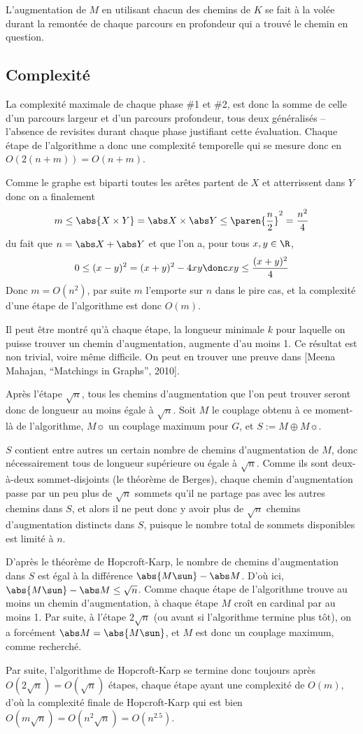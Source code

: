 L'augmentation de $M$ en utilisant chacun des chemins de $K$ se fait à la volée durant la remontée de chaque parcours en profondeur qui a trouvé le chemin en question.

 \subsection{Complexité}
 
  La complexité maximale de chaque phase \#1 et \#2, est donc la somme de celle d'un parcours largeur et d'un parcours profondeur, tous deux généralisés -- l'absence de revisites durant chaque phase justifiant cette évaluation. Chaque étape de l'algorithme a donc une complexité temporelle qui se mesure donc en $O(2(n+m)) = O(n + m)$.
 
 Comme le graphe est biparti toutes les arêtes partent de $X$ et atterrissent dans $Y$ donc on a finalement
 \[ m \leq \abs {X \times  Y} = \abs X \times \abs Y \leq \paren{\dfrac n 2}^2 = \dfrac {n^2} 4 \]
 du fait que $n = \abs X + \abs Y$ et que l'on a, pour tous $x,y \in \R$,
 \[0 \leq (x - y)^2  = (x + y)^2 - 4xy \donc xy \leq \frac{(x + y)^2}{4} \]
 Donc $m = O(n^2)$, par suite $m$ l'emporte sur $n$ dans le pire cas, et la complexité d'une étape de l'algorithme est donc $O(m)$.
 
 Il peut être montré qu'à chaque étape, la longueur minimale $k$ pour laquelle on puisse trouver un chemin d'augmentation, augmente d'au moins 1. Ce résultat est non trivial, voire même difficile. On peut en trouver une preuve dans [Meena Mahajan, ``Matchings in Graphs'', 2010].
 
 Après l'étape $\sqrt n$, tous les chemins d'augmentation que l'on peut trouver seront donc de longueur au moins égale à $\sqrt n$. Soit $M$ le couplage obtenu à ce moment-là de l'algorithme, $M\sun$ un couplage maximum pour $G$, et $S := M \oplus M\sun$.
 
 $S$ contient entre autres un certain nombre de chemins d'augmentation de $M$, donc nécessairement tous de longueur supérieure ou égale à $\sqrt n$. Comme ils sont deux-à-deux sommet-disjoints (\cf le théorème de Berges), chaque chemin d'augmentation passe par un peu plus de $\sqrt n$ sommets qu'il ne partage pas avec les autres chemins dans $S$, et alors il ne peut donc y avoir plus de $\sqrt n$ chemins d'augmentation distincts dans $S$, puisque le nombre total de sommets disponibles est limité à $n$.
 
 D'après le théorème de Hopcroft-Karp, le nombre de chemins d'augmentation dans $S$ est égal à la différence $\abs {M\sun} - \abs M$. D'où ici, $\abs {M\sun} - \abs M \leq \sqrt n$. Comme chaque étape de l'algorithme trouve au moins un chemin d'augmentation, à chaque étape $M$ croît en cardinal par au moins 1. Par suite, à l'étape $2 \sqrt n$ (ou avant si l'algorithme termine plus tôt), on a forcément $\abs M = \abs {M\sun}$, et $M$ est donc un couplage maximum, comme recherché.
 
 Par suite, l'algorithme de Hopcroft-Karp se termine donc toujours après $O(2\sqrt n) = O(\sqrt n)$ étapes, chaque étape ayant une complexité de $O(m)$, d'où la complexité finale de Hopcroft-Karp qui est bien $O(m \sqrt n) = O(n^2 \sqrt n) = O(n^{2.5})$.
 

